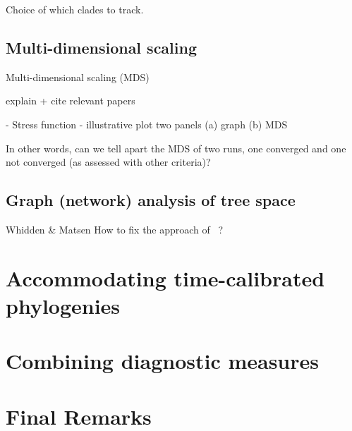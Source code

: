 Choice of which clades to track.

\subsection{Multi-dimensional scaling}
\label{sec:mds}

Multi-dimensional scaling (MDS)~\citep{Hillis2005} 

explain + cite relevant papers

- Stress function
- illustrative plot two panels (a) graph (b) MDS

In other words, can we tell apart the MDS of two runs, one converged and one not converged (as assessed with other criteria)?

\subsection{Graph (network) analysis of tree space}
\label{sec:graph}
Whidden \& Matsen
How to fix the approach of~\cite{Whidden2015} ?

\section{Accommodating time-calibrated phylogenies}
\label{sec:accommodating}

\section{Combining diagnostic measures}
\label{sec:combining}

\section{Final Remarks}
\label{sec:remarks}


% 
